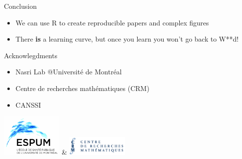 \documentclass[
  ignorenonframetext,
]{beamer}
\providecommand{\tightlist}{%
  \setlength{\itemsep}{0pt}\setlength{\parskip}{0pt}}\usepackage{longtable,booktabs,array}
\begin{document}
\begin{frame}{Conclusion}
\protect\hypertarget{conclusion}{}
\begin{itemize}[<+->]
\tightlist
\item
  We can use R to create reproducible papers and complex figures
\item
  There \textbf{is} a learning curve, but once you learn you won't go
  back to W**d!
\end{itemize}
\end{frame}

\begin{frame}{Acknowlegdments}
\protect\hypertarget{acknowlegdments}{}
\begin{itemize}[<+->]
\tightlist
\item
  Nasri Lab @Université de Montréal
\item
  Centre de recherches mathématiques (CRM)
\item
  CANSSI
\end{itemize}

\vspace{0.01em}
\centering

\includegraphics[width=3cm]{espum.jpg} \&
\includegraphics[width=3cm]{crm.png}
\end{frame}
\end{document}
